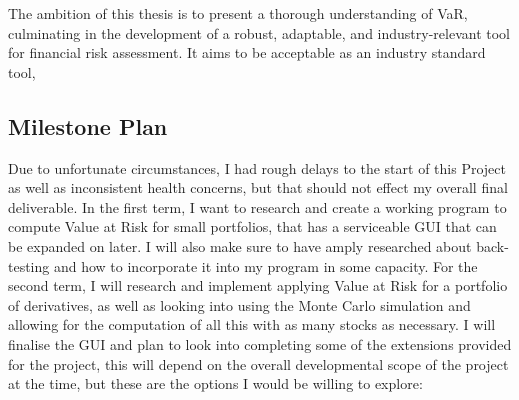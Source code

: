 \documentclass{article}
\begin{document}
The ambition of this thesis is to present a thorough understanding of VaR, culminating in the development of a robust, adaptable, and industry-relevant tool for financial risk assessment. It aims to be acceptable as an industry standard tool, 
  
\subsection{Milestone Plan}
Due to unfortunate circumstances, I had rough delays to the start of this Project as well as inconsistent health concerns, but that should not effect my overall final deliverable. In the first term, I want to research and create a working program to compute Value at Risk for small portfolios, that has a serviceable GUI that can be expanded on later. I will also make sure to have amply researched about back-testing and how to incorporate it into my program in some capacity. For the second term, I will research and implement applying Value at Risk for a portfolio of derivatives, as well as looking into using the Monte Carlo simulation and allowing for the computation of all this with as many stocks as necessary. I will finalise the GUI and plan to look into completing some of the extensions provided for the project, this will depend on the overall developmental scope of the project at the time, but these are the options I would be willing to explore:
\end{document}
